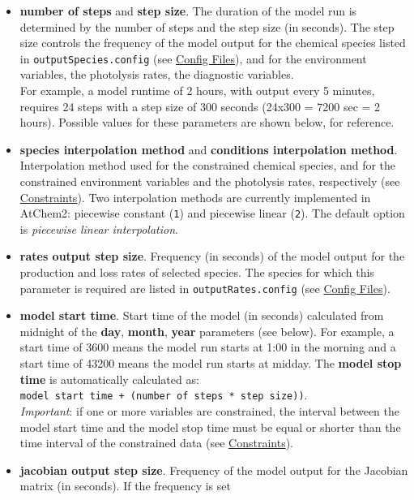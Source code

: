 \begin{itemize}
\item \textbf{number of steps} and \textbf{step size}. The duration of
  the model run is determined by the number of steps and the step size
  (in seconds). The step size controls the frequency of the model
  output for the chemical species listed in
  \texttt{outputSpecies.config} (see \hyperref[sec:config]{Config
    Files}), and for the environment variables, the photolysis rates,
  the diagnostic variables.\\ For example, a model runtime of 2 hours,
  with output every 5 minutes, requires 24 steps with a step size of
  300 seconds (24x300 = 7200 sec = 2 hours). Possible values for these
  parameters are shown below, for reference.
\item \textbf{species interpolation method} and \textbf{conditions
    interpolation method}. Interpolation method used for the
  constrained chemical species, and for the constrained environment
  variables and the photolysis rates, respectively (see
  \hyperref[sec:constraints]{Constraints}).  Two interpolation methods
  are currently implemented in AtChem2: piecewise constant
  (\texttt{1}) and piecewise linear (\texttt{2}). The default option
  is \emph{piecewise linear interpolation}.
\item \textbf{rates output step size}. Frequency (in seconds) of the
  model output for the production and loss rates of selected
  species. The species for which this parameter is required are listed
  in \texttt{outputRates.config} (see \hyperref[sec:config]{Config
    Files}).
\item \textbf{model start time}. Start time of the model (in seconds)
  calculated from midnight of the \textbf{day}, \textbf{month},
  \textbf{year} parameters (see below). For example, a start time of
  3600 means the model run starts at 1:00 in the morning and a start
  time of 43200 means the model run starts at midday. The
  \textbf{model stop time} is automatically calculated as:
  \texttt{model\ start\ time\ +\ (number\ of\ steps\ *\ step\
    size))}.\\ \emph{Important}: if one or more variables are
  constrained, the interval between the model start time and the model
  stop time must be equal or shorter than the time interval of the
  constrained data (see \hyperref[sec:constraints]{Constraints}).
\item \textbf{jacobian output step size}. Frequency of the model
  output for the Jacobian matrix (in seconds). If the frequency is set

\end{itemize}
